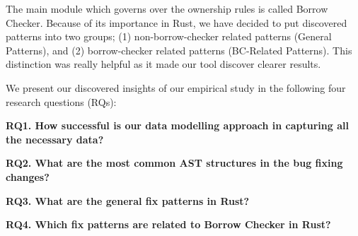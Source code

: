 The main module which governs over the ownership rules is called Borrow Checker. Because of its importance in Rust, we have decided to put discovered patterns into two groups; (1) non-borrow-checker related patterns (General Patterns), and (2) borrow-checker related patterns (BC-Related Patterns). This distinction was really helpful as it made our tool discover clearer results.

We present our discovered insights of our empirical study in the following four research
questions (RQs):

\textbf{RQ1. How successful is our data modelling approach in capturing all the necessary data?} 

\textbf{RQ2. What are the most common AST structures in the bug fixing changes?} 

\textbf{RQ3. What are the general fix patterns in Rust?} 

\textbf{RQ4. Which fix patterns are related to Borrow Checker in Rust?}

